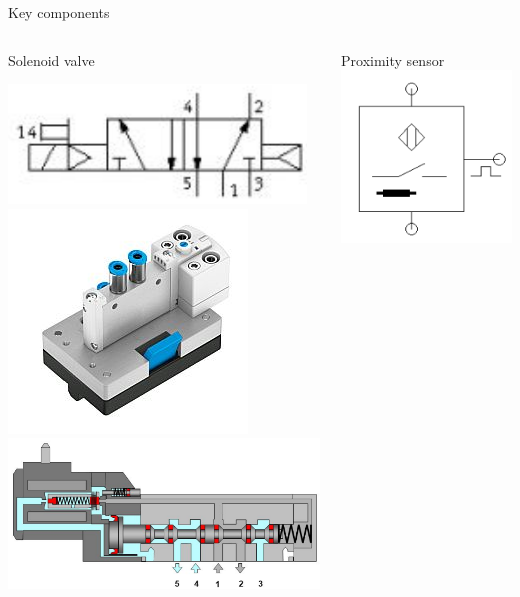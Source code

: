 \documentclass[presentation,aspectratio=1610]{beamer}
\begin{document}
\begin{frame}[label={sec:org46ecc84}]{Key components}
\begin{columns}
\begin{column}{0.33\columnwidth}
\begin{block}{Solenoid valve}
\begin{center}
\includegraphics[width=0.7\linewidth]{../../figures/festo-solenoid-52-symbol.png}\\
\includegraphics[width=0.45\linewidth]{../../figures/festo-solenoid-52.jpg}\\
\includegraphics[width=1.1\linewidth]{../../figures/festo-solenoid-schematic.png}\\
\end{center}
\end{block}
\end{column}
\begin{column}{0.33\columnwidth}
\begin{block}{Proximity sensor}
\includegraphics[width=0.4\linewidth]{../../figures/festo-inductive-sensor.png}\\

\end{block}
\end{column}
\end{columns}
\end{frame}
\end{document}
